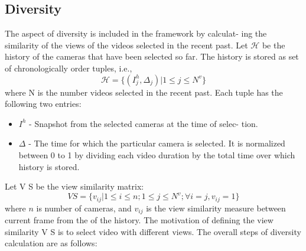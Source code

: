 \documentclass{sig-alternate-05-2015}
\begin{document}
\subsection{Diversity}
The aspect of diversity is included in the framework by calculat-
ing the similarity of the views of the videos selected in the recent
past. Let $\mathcal{H}$ be the history of the cameras that have been selected
so far. The history is stored as set of chronologically order tuples,
i.e.,
\begin{equation}
    \mathcal{H}=\{(I^h_j,\Delta_j)|1\leq j\leq N^v\}
\end{equation}
where N is the number videos selected in the recent past. Each
tuple has the following two entries:
 \begin{itemize} 
    \item $I^h$ - Snapshot from the selected cameras at the time of selec-
tion.
    \item $\Delta$ - The time for which the particular camera is selected. It
is normalized between 0 to 1 by dividing each video duration
by the total time over which history is stored.
 \end{itemize} 
Let V S be the view similarity matrix:
\begin{equation}
    VS = \{v_{ij}|1\leq i\leq n;1\leq j\leq N^v;\forall i=j,v_{ij}=1\}
\end{equation}
where $n$ is number of cameras, and $v_{ij}$ is the view similarity
measure between current frame from the %
of the history. The motivation of defining the view similarity V S is
to select video with different views. The overall steps of diversity
calculation are as follows:
\end{document}
